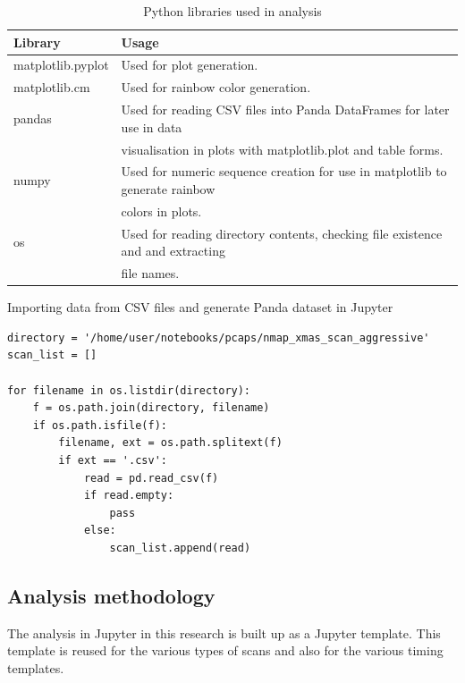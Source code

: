 \begin{table}[!htbp]
\caption{Python libraries used in analysis}
\begin{center}
\begin{tabular}{|l|l|}
\hline
\textbf{Library} & \textbf{Usage}\\
\hline
matplotlib.pyplot & Used for plot generation.\\
\hline
matplotlib.cm & Used for rainbow color generation.\\
\hline
pandas & Used for reading CSV files into Panda DataFrames for later use in data\\
& visualisation in plots with matplotlib.plot and table forms.\\
\hline
numpy & Used for numeric sequence creation for use in matplotlib to generate rainbow\\
& colors in plots.\\
\hline
os & Used for reading directory contents, checking file existence and and extracting\\
& file names.\\
\hline
\end{tabular}
\label{tbl:PythonLibsAnalysis}
\end{center}
\end{table}


\begin{listing}[!ht]
\caption{Importing data from CSV files and generate Panda dataset in Jupyter}
\label{lst:JupyterPandaImportCSV}
\begin{verbatim}
directory = '/home/user/notebooks/pcaps/nmap_xmas_scan_aggressive'
scan_list = []

for filename in os.listdir(directory):
    f = os.path.join(directory, filename)
    if os.path.isfile(f):
        filename, ext = os.path.splitext(f)
        if ext == '.csv':
            read = pd.read_csv(f)
            if read.empty:
                pass
            else:
                scan_list.append(read)
\end{verbatim}
\end{listing}


\subsection{Analysis methodology}
\label{s:AnalysisMethod}
The analysis in Jupyter in this research is built up as a Jupyter template.
This template is reused for the various types of scans and also for the various timing templates.


